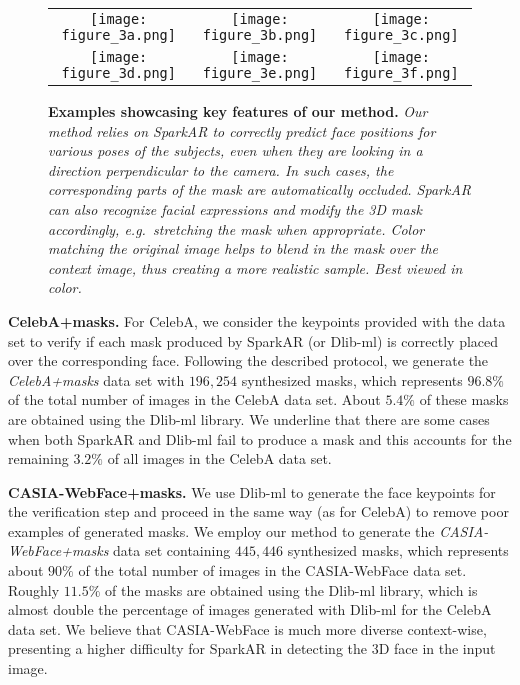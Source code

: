 \documentclass{article}
\begin{document}
\begin{figure}[t]
\begin{center}
\begin{tabular}{@{~}c@{~}c@{~}c}
   \texttt{[image: figure\_3a.png]} &
   \texttt{[image: figure\_3b.png]} &
   \texttt{[image: figure\_3c.png]} \\
\texttt{[image: figure\_3d.png]} &
   \texttt{[image: figure\_3e.png]} &
   \texttt{[image: figure\_3f.png]} 
   \end{tabular}
\end{center}
\vspace{-0.3cm}
   \caption{{\bf Examples showcasing key features of our method. }\emph{Our method relies on SparkAR to correctly predict face positions for various poses of the subjects, even when they are looking in a direction perpendicular to the camera. In such cases, the corresponding parts of the mask are automatically occluded. SparkAR can also recognize facial expressions and modify the 3D mask accordingly, e.g.~stretching the mask when appropriate.  Color matching the original image helps to blend in the mask over the context image, thus creating a more realistic sample. Best viewed in color.}}
\label{fig:key-features} 
\end{figure}





{\bf CelebA+masks.} For CelebA, we consider the keypoints provided with the data set to verify if each mask produced by SparkAR (or Dlib-ml) is correctly placed over the corresponding face. Following the described protocol, we generate the {\emph {CelebA+masks}} data set with $196,254$ synthesized masks, which represents $96.8\%$ of the total number of images in the CelebA data set. About $5.4\%$ of these masks are obtained using the Dlib-ml library. We underline that there are some cases when both SparkAR and Dlib-ml fail to produce a mask and this accounts for the remaining $3.2\%$ of all images in the CelebA data set.

{\bf CASIA-WebFace+masks.} We use Dlib-ml to generate the face keypoints for the verification step and proceed in the same way (as for CelebA) to remove poor examples of generated masks. We employ our method to generate the {\emph {CASIA-WebFace+masks}} data set containing $445,446$ synthesized masks, which represents about $90\%$ of the total number of images in the CASIA-WebFace data set. Roughly $11.5\%$ of the masks are obtained using the Dlib-ml library, which is almost double the percentage of images generated with Dlib-ml for the CelebA data set. We believe that CASIA-WebFace is much more diverse context-wise, presenting a higher difficulty for SparkAR in detecting the 3D face in the input image.
\end{document}
